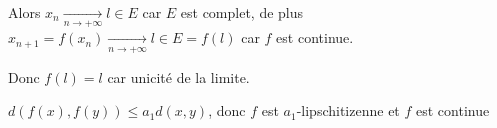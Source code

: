 \begin{myproof}{}{}
\begin{enumerate}
      Alors $x_n \underset{n \to + \infty}{\longrightarrow} l \in E$ car $E$ est complet, de plus $x _{n+1} =f(x_n) \underset{n \to + \infty}{\longrightarrow}  l\in E = f(l)$ car $f$ est continue.

      Donc $f(l) = l$ car unicité de la limite.

      $d(f(x), f(y)) \le a_1 d(x, y)$, donc $f$ est $a_1$-lipschitizenne et $f$ est continue

\end{enumerate}
\end{myproof}



